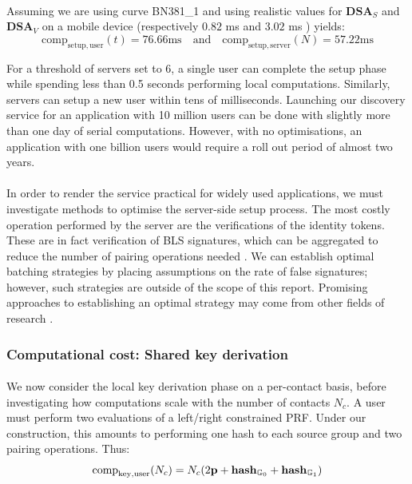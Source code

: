 	\paragraph{} Assuming we are using curve BN381\_1 and using realistic values for $\mathbf{DSA}_S$ and $\mathbf{DSA}_V$ on a mobile device (respectively $0.82$ ms and $3.02$ ms \cite{WolfSSl}) yields:
	\begin{equation}
		\mathrm{comp}_{\mathrm{setup, user}}(t) = 76.66 \mathrm{ms} \quad \mathrm{and} \quad \mathrm{comp}_{\mathrm{setup, server}}(N) = 57.22 \mathrm{ms}
	\end{equation}
	
	\noindent For a threshold of servers set to $6$, a single user can complete the setup phase while spending less than 0.5 seconds performing local computations. Similarly, servers can setup a new user within tens of milliseconds. Launching our discovery service for an application with 10 million users can be done with slightly more than one day of serial computations. However, with no optimisations, an application with one billion users would require a roll out period of almost two years.
	
	\paragraph{} In order to render the service practical for widely used applications, we must investigate methods to optimise the server-side setup process. The most costly operation performed by the server are the verifications of the identity tokens. These are in fact verification of BLS signatures, which can be aggregated to reduce the number of pairing operations needed \cite{BLSagg}. We can establish optimal batching strategies by placing assumptions on the rate of false signatures; however, such strategies are outside of the scope of this report. Promising approaches to establishing an optimal strategy may come from other fields of research \cite{covid}. 
	
	\subsubsection{Computational cost: Shared key derivation}
	
	\paragraph{} We now consider the local key derivation phase on a per-contact basis, before investigating how computations scale with the number of contacts $N_c$. A user must perform two evaluations of a left/right constrained PRF. Under our construction, this amounts to performing one hash to each source group and two pairing operations. Thus:
	\begin{equation}
		\mathrm{comp}_{\mathrm{key, user}}(N_c) = N_c(2\mathbf{p} + \mathbf{hash}_{\mathbb{G}_0} + \mathbf{hash}_{\mathbb{G}_1})
	\end{equation}

